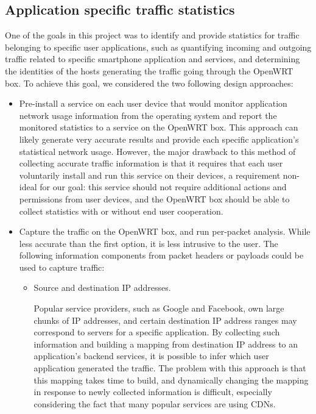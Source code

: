\subsection{Application specific traffic statistics}
\label{sec:app-specific-design}

One of the goals in this project was to identify and provide statistics for traffic belonging to specific user applications, such as quantifying incoming and outgoing traffic related to specific smartphone application and services, and determining the identities of the hosts generating the traffic going through the OpenWRT box. To achieve this goal, we considered the two following design approaches:

\begin{itemize}

\item Pre-install a service on each user device that would monitor application network usage information from the operating system and report the monitored statistics to a service on the OpenWRT box. This approach can likely generate very accurate results and provide each specific application's statistical network usage. However, the major drawback to this method of collecting accurate traffic information is that it requires that each user voluntarily install and run this service on their devices, a requirement non-ideal for our goal: this service should not require additional actions and permissions from user devices, and the OpenWRT box should be able to collect statistics with or without end user cooperation.

\item Capture the traffic on the OpenWRT box, and run per-packet analysis. While less accurate than the first option, it is less intrusive to the user. The following information components from packet headers or payloads could be used to capture traffic:

  \begin{itemize}

  \item Source and destination IP addresses. 

  Popular service providers, such as Google and Facebook, own large chunks of IP addresses, and certain destination IP address ranges may correspond to servers for a specific application. By collecting such information and building a  mapping from destination IP address to an application's backend services, it is possible to infer which user application generated the traffic. The problem with this approach is that this mapping takes time to build, and dynamically changing the mapping in response to newly collected information is difficult, especially considering the fact that many popular services are using CDNs.


\end{itemize}
\end{itemize}

